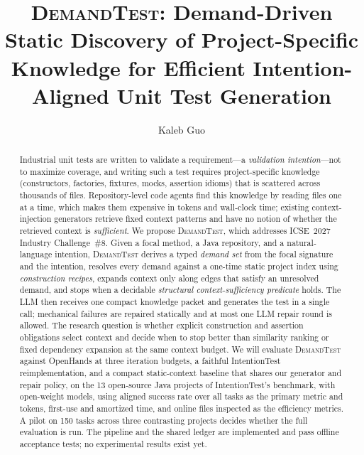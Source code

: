 \documentclass[sigconf,nonacm]{acmart}
\newcommand{\tool}{\textsc{DemandTest}\xspace}
\begin{document}
\title{\tool: Demand-Driven Static Discovery of Project-Specific Knowledge for Efficient Intention-Aligned Unit Test Generation}

\author{Kaleb Guo}

\begin{abstract}
Industrial unit tests are written to validate a requirement---a \emph{validation intention}---not to maximize coverage, and writing such a test requires project-specific knowledge (constructors, factories, fixtures, mocks, assertion idioms) that is scattered across thousands of files. Repository-level code agents find this knowledge by reading files one at a time, which makes them expensive in tokens and wall-clock time; existing context-injection generators retrieve fixed context patterns and have no notion of whether the retrieved context is \emph{sufficient}. We propose \tool, which addresses ICSE~2027 Industry Challenge~\#8. Given a focal method, a Java repository, and a natural-language intention, \tool derives a typed \emph{demand set} from the focal signature and the intention, resolves every demand against a one-time static project index using \emph{construction recipes}, expands context only along edges that satisfy an unresolved demand, and stops when a decidable \emph{structural context-sufficiency predicate} holds. The LLM then receives one compact knowledge packet and generates the test in a single call; mechanical failures are repaired statically and at most one LLM repair round is allowed. The research question is whether explicit construction and assertion obligations select context and decide when to stop better than similarity ranking or fixed dependency expansion at the same context budget. We will evaluate \tool against OpenHands at three iteration budgets, a faithful IntentionTest reimplementation, and a compact static-context baseline that shares our generator and repair policy, on the 13 open-source Java projects of IntentionTest's benchmark, with open-weight models, using aligned success rate over all tasks as the primary metric and tokens, first-use and amortized time, and online files inspected as the efficiency metrics. A pilot on 150 tasks across three contrasting projects decides whether the full evaluation is run. The pipeline and the shared ledger are implemented and pass offline acceptance tests; no experimental results exist yet.
\end{abstract}
\end{document}
